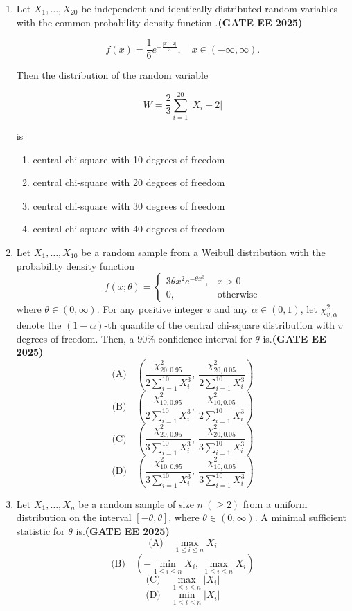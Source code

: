 \documentclass[journal,12pt,onecolumn]{IEEEtran}
\theoremstyle{remark}
\begin{document}
\begin{enumerate}
\item Let $X_{1}, \ldots, X_{20}$ be independent and identically distributed random variables with the common probability density function .\hfill \textbf{(GATE EE 2025)}

\[
f(x) = \frac{1}{6} e^{-\frac{|x-2|}{3}}, \quad x \in (-\infty, \infty).
\]

Then the distribution of the random variable  

\[
W = \frac{2}{3} \sum_{i=1}^{20} |X_i - 2|
\]

is  

\begin{enumerate}
    \item central chi-square with 10 degrees of freedom
    \item central chi-square with 20 degrees of freedom
    \item central chi-square with 30 degrees of freedom
    \item central chi-square with 40 degrees of freedom
\end{enumerate}


\item Let $X_{1}, \ldots, X_{10}$ be a random sample from a Weibull distribution with the probability density function
\[
f(x;\theta) = 
\begin{cases}
3 \theta x^{2} e^{-\theta x^{3}}, & x > 0 \\
0, & \text{otherwise}
\end{cases}
\]
where $\theta \in (0, \infty)$. For any positive integer $v$ and any $\alpha \in (0,1)$, let $\chi^2_{v, \alpha}$ denote the $(1-\alpha)$-th quantile of the central chi-square distribution with $v$ degrees of freedom. Then, a 90\% confidence interval for $\theta$ is.\hfill \textbf{(GATE EE 2025)}
\[
\text{(A)} \quad \left( \frac{\chi^2_{20,0.95}}{2 \sum_{i=1}^{10} X_i^3}, \ \frac{\chi^2_{20,0.05}}{2 \sum_{i=1}^{10} X_i^3} \right)
\]
\[
\text{(B)} \quad \left( \frac{\chi^2_{10,0.95}}{2 \sum_{i=1}^{10} X_i^3}, \ \frac{\chi^2_{10,0.05}}{2 \sum_{i=1}^{10} X_i^3} \right)
\]
\[
\text{(C)} \quad \left( \frac{\chi^2_{20,0.95}}{3 \sum_{i=1}^{10} X_i^3}, \ \frac{\chi^2_{20,0.05}}{3 \sum_{i=1}^{10} X_i^3} \right)
\]
\[
\text{(D)} \quad \left( \frac{\chi^2_{10,0.95}}{3 \sum_{i=1}^{10} X_i^3}, \ \frac{\chi^2_{10,0.05}}{3 \sum_{i=1}^{10} X_i^3} \right)
\]


\item Let $X_{1}, \ldots, X_{n}$ be a random sample of size $n \ (\geq 2)$ from a uniform distribution on the interval $[-\theta, \theta]$, where $\theta \in (0, \infty)$. A minimal sufficient statistic for $\theta$ is.\hfill \textbf{(GATE EE 2025)}
\[
\text{(A)} \quad \max_{1 \leq i \leq n} X_i
\]
\[
\text{(B)} \quad \left( -\min_{1 \leq i \leq n} X_i, \ \max_{1 \leq i \leq n} X_i \right)
\]
\[
\text{(C)} \quad \max_{1 \leq i \leq n} |X_i|
\]
\[
\text{(D)} \quad \min_{1 \leq i \leq n} |X_i|
\]



\end{enumerate}
\end{document}
